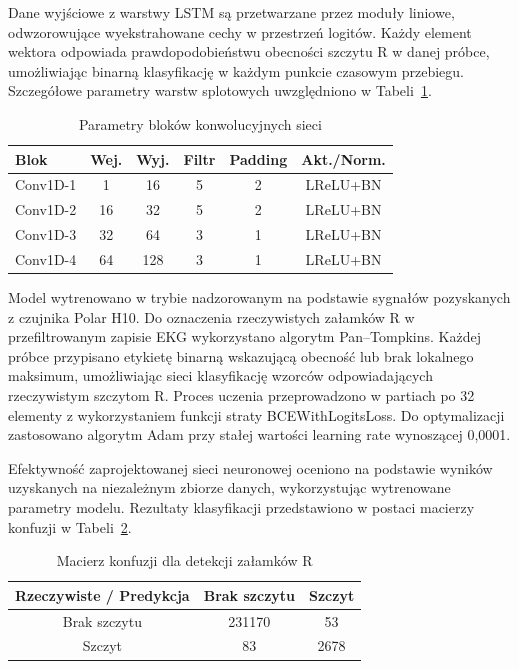 \documentclass[journal]{IEEEtran}
\begin{document}
\newpage
Dane wyjściowe z warstwy LSTM są przetwarzane przez moduły liniowe, odwzorowujące wyekstrahowane cechy w przestrzeń logitów. Każdy element wektora odpowiada prawdopodobieństwu obecności szczytu R w danej próbce, umożliwiając binarną klasyfikację w każdym punkcie czasowym przebiegu. Szczegółowe parametry warstw splotowych uwzględniono w Tabeli~\ref{tab:ecg_layers}.

\begin{table}[h!]
\centering
\caption{Parametry bloków konwolucyjnych sieci}
\label{tab:ecg_layers}
\begin{tabular}{|l|c|c|c|c|c|}
\hline
\textbf{Blok} & \textbf{Wej.} & \textbf{Wyj.} & \textbf{Filtr} & \textbf{Padding} & \textbf{Akt./Norm.} \\
\hline
Conv1D-1 & 1   & 16  & 5 & 2 & LReLU+BN \\
Conv1D-2 & 16  & 32  & 5 & 2 & LReLU+BN \\
Conv1D-3 & 32  & 64  & 3 & 1 & LReLU+BN \\
Conv1D-4 & 64  & 128 & 3 & 1 & LReLU+BN \\
\hline
\end{tabular}
\end{table}

Model wytrenowano w trybie nadzorowanym na podstawie sygnałów pozyskanych z czujnika Polar H10. Do oznaczenia rzeczywistych załamków R w przefiltrowanym zapisie EKG wykorzystano algorytm Pan–Tompkins. Każdej próbce przypisano etykietę binarną wskazującą obecność lub brak lokalnego maksimum, umożliwiając sieci klasyfikację wzorców odpowiadających rzeczywistym szczytom R. Proces uczenia przeprowadzono w partiach po 32 elementy z wykorzystaniem funkcji straty BCEWithLogitsLoss. Do optymalizacji zastosowano algorytm Adam przy stałej wartości learning rate wynoszącej 0,0001.

Efektywność zaprojektowanej sieci neuronowej oceniono na podstawie wyników uzyskanych na niezależnym zbiorze danych, wykorzystując wytrenowane parametry modelu. Rezultaty klasyfikacji przedstawiono w postaci macierzy konfuzji w Tabeli~\ref{tab:conf_matrix}.

\begin{table}[ht]
\centering
\caption{Macierz konfuzji dla detekcji załamków R}
\label{tab:conf_matrix}
\begin{tabular}{|c|c|c|}
\hline
\textbf{Rzeczywiste / Predykcja} & \textbf{Brak szczytu } & \textbf{Szczyt } \\
\hline
Brak szczytu  & 231170 & 53 \\
Szczyt  & 83 & 2678 \\
\hline
\end{tabular}
\end{table}
\end{document}
